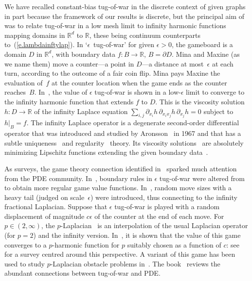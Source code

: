 \documentclass[letterpaper,11pt,oneside,reqno]{amsbook}
\newcommand{\e}[0]{\epsilon}
\newcommand{\R}{\ensuremath{\mathbb{R}}}
\numberwithin{figure}{chapter}
\theoremstyle{definition}
\theoremstyle{definition}
\theoremstyle{definition}
\theoremstyle{definition}
\theoremstyle{definition}
\begin{document}
We have recalled constant-bias tug-of-war in the discrete context of  given graphs in part because the framework of our results is discrete, but the principal aim of~\cite{PSSW09} 
was to relate tug-of-war in a low mesh limit to 
 infinity harmonic functions mapping domains in $\R^d$ to $\R$, these being continuum counterparts to~(\ref{e.lambdainftylap}).
In `$\e$~tug-of-war' for given $\e > 0$,  the gameboard is a domain $D$ in $\R^d$, with boundary data $f: B \to \R$, $B = \partial D$. Mina and Maxine (as we name them) move a counter---a point in $D$---a distance at most~$\e$ at each turn, according to the outcome of a fair coin flip. Mina pays Maxine the evaluation of~$f$ at the counter location when the game ends as the counter reaches~$B$. In~\cite{PSSW09},
 the value of $\e$ tug-of-war is shown in a low-$\e$ limit to converge to the infinity harmonic function that extends $f$ to $D$. This is the viscosity solution~$h:D \to \R$ of the infinity Laplace equation 
 $\sum_{i,j} \partial_{x_i} h \,  \partial_{x_i x_j} h \, \partial_{x_j} h = 0$ subject to $h \big\vert_B = f$.
 The infinity Laplace operator is a degenerate second-order differential operator that was introduced and studied by Aronsson~\cite{Aronsson67,Aronsson68} in 1967 and that has 
   a subtle uniqueness~\cite{Jensen93}  and regularity~\cite{Savin05,EvansSavin}  theory. Its viscosity solutions~\cite{CIL92} are absolutely minimizing Lipschitz functions extending the given boundary data~\cite{Jensen93}. 
   
   As \cite{Manfredi2012} surveys, the game theory connection identified in~\cite{PSSW09} sparked much attention from the PDE community.    
In~\cite{ArmstrongSmart2012}, boundary rules in $\e$ tug-of-war were altered from~\cite{PSSW09}
to obtain more regular game value functions. In~\cite{CCF2012}, random move sizes with a heavy tail (judged on scale~$\e$) were introduced, thus connecting to the infinity fractional Laplacian.
Suppose that $\e$ tug-of-war is played with a random displacement of magnitude $c \e$ of the counter at the end of each move. 
For $p \in (2,\infty)$, the $p$-Laplacian~\cite{Lindqvist} is an interpolation of the usual Laplacian operator (for $p=2$) and the infinity version. 
In~\cite{PeresSheffield}, it is shown that the value of this game converges to a $p$-harmonic function for $p$ suitably chosen as a function of $c$: see~\cite{Lewicka}
for a survey centred around this perspective.  A variant of this game has been used to study $p$-Laplacian obstacle problems in~\cite{LewickaMarta2017}.
The book~\cite{BlancRossi} reviews  the abundant connections between tug-of-war and PDE. 
\end{document}
